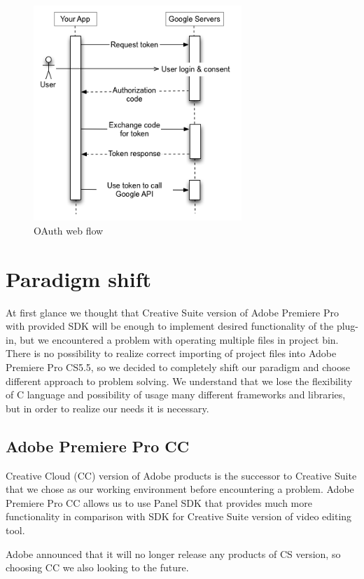 \documentclass[thesis=B,english]{FITthesis}[2012/10/20]
\begin{document}
	\begin{figure}
		\centering
		\includegraphics[width=0.7\textwidth]{oauthwebflow.png}
		\caption{OAuth web flow}\label{fig:oauth}
	\end{figure}
\section{Paradigm shift}
At first glance we thought that Creative Suite version of Adobe Premiere Pro with provided SDK will be enough to implement desired functionality of the plug-in, but we encountered a problem with operating multiple files in project bin. There is no possibility to realize correct importing of project files into Adobe Premiere Pro CS5.5, so we decided to completely shift our paradigm and choose different approach to problem solving. We understand that we lose the flexibility of C language and possibility of usage many different frameworks and libraries, but in order to realize our needs it is necessary.
\subsection{Adobe Premiere Pro CC}
Creative Cloud (CC) version of Adobe products is the successor to Creative Suite that we chose as our working environment before encountering a problem. Adobe Premiere Pro CC allows us to use Panel SDK that provides much more functionality in comparison with SDK for Creative Suite version of video editing tool. 

Adobe announced that it will no longer release any products of CS version\cite{CC}, so choosing CC we also looking to the future. 
\end{document}
